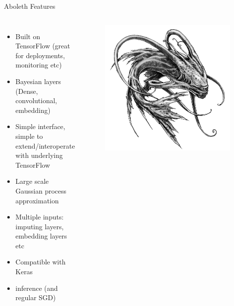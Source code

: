 \documentclass[lualatex, aspectratio=169]{beamer}
\begin{document}
\begin{frame}{Aboleth Features}
  \begin{columns}
    \column{0.7\pagewidth}
    \begin{itemize}
      \item Built on TensorFlow (great for deployments, monitoring etc)
      \item Bayesian layers (Dense, convolutional, embedding)
      \item Simple interface, simple to extend/interoperate with underlying TensorFlow
      \item Large scale Gaussian process approximation
      \item Multiple inputs: imputing layers, embedding layers etc
      \item Compatible with Keras
      \item {} inference (and regular SGD)
    \end{itemize}
    \column{0.25\pagewidth}
    \begin{figure}
      \includegraphics[width=0.25\pagewidth]{assets/aboleth.jpg}
    \end{figure}
  \end{columns}
\end{frame}
\end{document}

